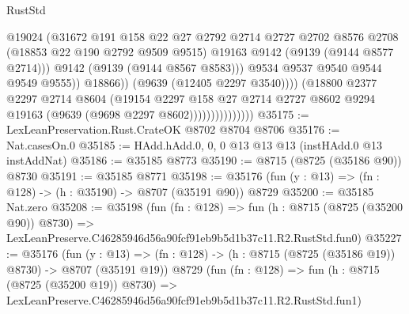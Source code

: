 \begin{lexlean}{RustStd}
\begin{coremodule}
                                        @19024
                                        (@31672
                                          @191
                                          @158
                                          @22
                                          @27
                                          @2792
                                          @2714
                                          @2727
                                          @2702
                                          @8576
                                          @2708
                                          (@18853 @22 @190 @2792 @9509 @9515)
                                          @19163
                                          @9142
                                          (@9139 (@9144 @8577 @2714)))
                                        @9142
                                        (@9139 (@9144 @8567 @8583)))
                                      @9534
                                      @9537
                                      @9540
                                      @9544
                                      @9549
                                      @9555))
                                  @18866))
                              (@9639 (@12405 @2297 @3540))))
                          (@18800
                            @2377
                            @2297
                            @2714
                            @8604
                            (@19154
                              @2297
                              @158
                              @27
                              @2714
                              @2727
                              @8602
                              @9294
                              @19163
                              (@9639 (@9698 @2297 @8602)))))))))))))))
@35175 := LexLeanPreservation.Rust.CrateOK @8702 @8704 @8706
@35176 := Nat.casesOn.{0}
@35185 := HAdd.hAdd.{0, 0, 0} @13 @13 @13 (instHAdd.{0} @13 instAddNat)
@35186 := @35185 @8773
@35190 := @8715 (@8725 (@35186 @90)) @8730
@35191 := @35185 @8771
@35198 := @35176 (fun (y : @13) => (fn : @128) -> (h : @35190) -> @8707 (@35191 @90)) @8729
@35200 := @35185 Nat.zero
@35208 := @35198
    (fun (fn : @128) =>
    fun (h : @8715 (@8725 (@35200 @90)) @8730) =>
    LexLeanPreserve.C46285946d56a90fcf91eb9b5d1b37c11.R2.RustStd.fun0)
@35227 := @35176
    (fun (y : @13) => (fn : @128) -> (h : @8715 (@8725 (@35186 @19)) @8730) -> @8707 (@35191 @19))
    @8729
    (fun (fn : @128) =>
    fun (h : @8715 (@8725 (@35200 @19)) @8730) =>
    LexLeanPreserve.C46285946d56a90fcf91eb9b5d1b37c11.R2.RustStd.fun1)

\end{coremodule}
\end{lexlean}
